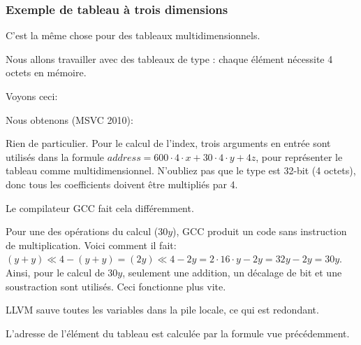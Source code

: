 \subsubsection{Exemple de tableau à trois dimensions}

C'est la même chose pour des tableaux multidimensionnels.

Nous allons travailler avec des tableaux de type \Tint: chaque élément nécessite
4 octets en mémoire.

Voyons ceci:




Nous obtenons (MSVC 2010):



Rien de particulier. Pour le calcul de l'index, trois arguments en entrée sont utilisés
dans la formule $address=600 \cdot 4 \cdot x + 30 \cdot 4 \cdot y + 4z$, pour représenter
le tableau comme multidimensionnel.
N'oubliez pas que le type \Tint est 32-bit (4 octets), donc tous les coefficients
doivent être multipliés par 4.



Le compilateur GCC fait cela différemment.

Pour une des opérations du calcul ($30y$), GCC produit un code sans instruction de
multiplication. Voici comment il fait:
$(y+y) \ll 4 - (y+y) = (2y) \ll 4 - 2y = 2 \cdot 16 \cdot y - 2y = 32y - 2y = 30y$. 
Ainsi, pour le calcul de $30y$, seulement une addition, un décalage de bit et une
soustraction sont utilisés.
Ceci fonctionne plus vite.




LLVM \NonOptimizing sauve toutes les variables dans la pile locale, ce qui est redondant.

L'adresse de l'élément du tableau est calculée par la formule vue précédemment.




